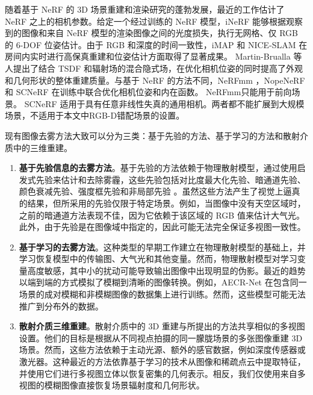 随着基于 NeRF 的 3D 场景重建和渲染研究的蓬勃发展，最近的工作估计了 NeRF 之上的相机参数。给定一个经过训练的 NeRF 模型，iNeRF\cite{yen-chen_inerf_2021} 能够根据观察到的图像和来自 NeRF 模型的渲染图像之间的光度损失，执行无网格、仅 RGB 的 6-DOF 位姿估计。由于 RGB 和深度的时间一致性，iMAP\cite{sucar_imap_2021} 和 NICE-SLAM\cite{zhu_nice-slam_2022} 在房间内实时进行高保真重建和位姿估计方面取得了显著成果。 Martin-Brualla 等人提出了结合 TSDF 和辐射场的混合隐式场\cite{azinovic_neural_2022}，在优化相机位姿的同时提高了外观和几何形状的整体重建质量。与基于 NeRF 的方法不同，NeRFmm \cite{wang_nerf--_2022}，NopeNeRF\cite{bian_nope-nerf_2022} 和 SCNeRF \cite{jeong_self-calibrating_2021} 在训练中联合优化相机位姿和内在函数。 NeRFmm\cite{wang_nerf--_2022}只能用于前向场景。 SCNeRF\cite{jeong_self-calibrating_2021} 适用于具有任意非线性失真的通用相机。两者都不能扩展到大规模场景，不适用于本文中RGB-D错配场景的设置。

现有图像去雾方法大致可以分为三类：基于先验的方法、基于学习的方法和散射介质中的三维重建。
\begin{enumerate}
    \item \textbf{基于先验信息的去雾方法}。基于先验的方法依赖于物理散射模型，通过使用启发式先验来估计和去除雾霾，这些先验包括对比度最大化先验、暗通道先验、颜色衰减先验、强度框先验和非局部先验 \cite{kaiming_he_single_2009, nishino_bayesian_2012, fattal_dehazing_2015, wu_contrastive_2021}。虽然这些方法产生了视觉上逼真的结果，但所采用的先验仅限于特定场景。例如，当图像中没有天空区域时，之前的暗通道方法表现不佳\cite{kaiming_he_single_2009}，因为它依赖于该区域的 RGB 值来估计大气光。此外，由于先验是在图像域中指定的，因此可能无法完全保证多视图一致性。
    \item \textbf{基于学习的去雾方法}。这种类型的早期工作\cite{cai_dehazenet_2016, fujimura_dehazing_2021, dong_multi-scale_2020, li_aod-net_2017, liu_griddehazenet_2019, qin_ffa-net_2020, qu_enhanced_2019, ren_gated_2018, ren_single_2020, zhang_densely_2018}建立在物理散射模型的基础上，并学习恢复模型中的传输图、大气光和其他变量。然而，物理散射模型对学习变量高度敏感，其中小的扰动可能导致输出图像中出现明显的伪影。最近的趋势\cite{song_vision_2022, liu_griddehazenet_2019, chen_gated_2019, deng_hardgan_2020, dong_multi-scale_2020, qin_ffa-net_2020, wu_contrastive_2021, wang_eaa-net_2021} 以端到端的方式模拟了模糊到清晰的图像转换。例如，AECR-Net \cite{wu_contrastive_2021} 在包含同一场景的成对模糊和非模糊图像的数据集上进行训练。然而，这些模型可能无法推广到分布外的数据。
    \item \textbf{散射介质三维重建}。散射介质中的 3D 重建与所提出的方法共享相似的多视图设置。他们的目标是根据从不同视点拍摄的同一朦胧场景的多张图像重建 3D 场景。然而，这些方法依赖于主动光源\cite{murez_photometric_2017, narasimhan_structured_2005, fujimura_photometric_2018, tsiotsios_backscatter_2014}、额外的感官数据，例如深度传感器或激光器\cite{caraffa_stereo_2013, li_simultaneous_2015, heide_imaging_2014, satat_towards_2018, wang_programmable_2018}。这种最近的方法\cite{fujimura_dehazing_2021, caraffa_stereo_2013, song_deep_2019, li_simultaneous_2015}依靠基于学习的技术从图像和稀疏点云中提取特征，并使用它们进行多视图立体以恢复密集的几何表示。相反，我们仅使用来自多视图的模糊图像直接恢复场景辐射度和几何形状。
\end{enumerate}

